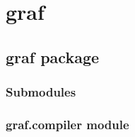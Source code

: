 \documentclass[letterpaper,10pt,english]{sphinxmanual}
\begin{document}
\chapter{graf}
\label{graf/modules::doc}\label{graf/modules:graf}

\section{graf package}
\label{graf/graf:graf-package}\label{graf/graf::doc}

\subsection{Submodules}
\label{graf/graf:submodules}

\subsection{graf.compiler module}
\label{graf/graf:module-graf.compiler}\label{graf/graf:graf-compiler-module}
\end{document}
